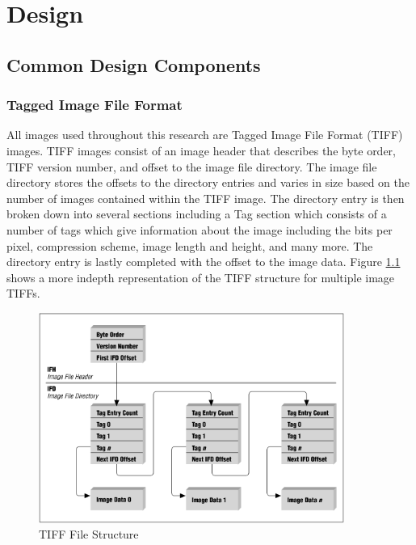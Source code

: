 
\chapter{Design}

\section{Common Design Components}

\subsection{Tagged Image File Format}
All images used throughout this research are Tagged Image File Format (TIFF) images. TIFF images consist of an image header that describes the byte order, TIFF version number, and offset to the image file directory\cite{Wiggins2001}.  The image file directory stores the offsets to the directory entries and varies in size based on the number of images contained within the TIFF image.  The directory entry is then broken down into several sections including a Tag section which consists of a number of tags which give information about the image including the bits per pixel, compression scheme, image length and height, and many more.  The directory entry is lastly completed with the offset to the image data. Figure \ref{fig:tiffFormat} shows a more indepth representation of the TIFF structure for multiple image TIFFs.

\begin{figure}
  \centering
  \includegraphics[width=10cm]{./img/tiffFormat.png}
  \caption{TIFF File Structure\cite{Murray1996}}
  \label{fig:tiffFormat}
\end{figure}

